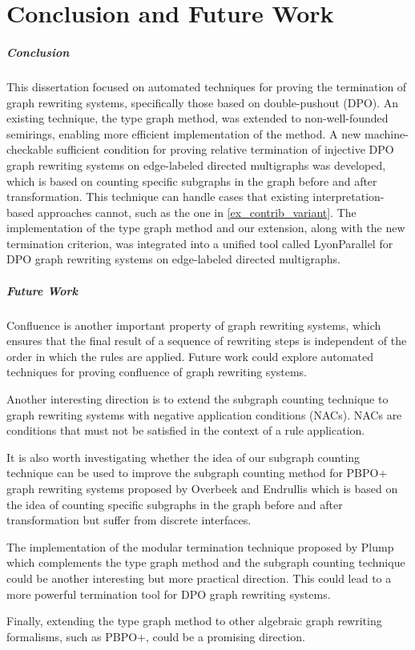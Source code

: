 \documentclass{report}
\begin{document}
% 
 
\chapter{Conclusion and Future Work}
\paragraph{Conclusion}
This dissertation focused on automated techniques for proving the termination of graph rewriting systems, specifically those based on double-pushout (DPO).
An existing technique, the type graph method, was extended to non-well-founded semirings, enabling more efficient implementation of the method. 
A new machine-checkable sufficient condition for proving relative termination of injective DPO graph rewriting systems on edge-labeled directed multigraphs was developed, which is based on counting specific subgraphs in the graph before and after transformation. This technique can handle cases that existing interpretation-based approaches cannot, such as the one in \autoref{ex_contrib_variant}.
The implementation of the type graph method and our extension, along with the new termination criterion, was integrated into a unified tool called LyonParallel for DPO graph rewriting systems on edge-labeled directed multigraphs.

\paragraph{Future Work}
Confluence is another important property of graph rewriting systems, which ensures that the final result of a sequence of rewriting steps is independent of the order in which the rules are applied. Future work could explore automated techniques for proving confluence of graph rewriting systems.

Another interesting direction is to extend the subgraph counting technique to graph rewriting systems with negative application conditions (NACs). NACs are conditions that must not be satisfied in the context of a rule application.

It is also worth investigating whether the idea of our subgraph counting technique can be used to improve the subgraph counting method for PBPO+ graph rewriting systems proposed by Overbeek and Endrullis which is based on the idea of counting specific subgraphs in the graph before and after transformation but suffer from discrete interfaces.

The implementation of the modular termination technique proposed by Plump which complements the type graph method and the subgraph counting technique could be another interesting but more practical direction. This could lead to a more powerful termination tool for DPO graph rewriting systems.

Finally, extending the type graph method to other algebraic graph rewriting formalisms, such as PBPO+, could be a promising direction.

\printbibliography
\end{document}
